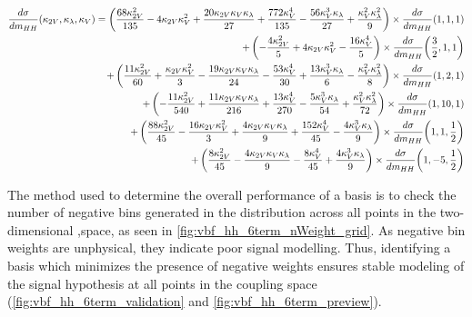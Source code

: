     \begin{equation}
    \label{eqn:vbf_hh_6term_chosen}
    \begin{split}
        \frac{d\sigma}{dm_{HH}}(\kappa_{2V}, \kappa_{\lambda}, \kappa_{V}) =
            \left(\frac{68 \kappa_{2V}^{2}}{135} - 4 \kappa_{2V} \kappa_{V}^{2} + \frac{20 \kappa_{2V} \kappa_{V} \kappa_{\lambda}}{27} + \frac{772 \kappa_{V}^{4}}{135} - \frac{56 \kappa_{V}^{3} \kappa_{\lambda}}{27} + \frac{\kappa_{V}^{2} \kappa_{\lambda}^{2}}{9}\right) \times \frac{d\sigma}{dm_{HH}}{\left(1,1,1 \right)} \\
            + \left(- \frac{4 \kappa_{2V}^{2}}{5} + 4 \kappa_{2V} \kappa_{V}^{2} - \frac{16 \kappa_{V}^{4}}{5}\right) \times \frac{d\sigma}{dm_{HH}}{\left(\frac{3}{2},1,1 \right)} \\
            + \left(\frac{11 \kappa_{2V}^{2}}{60} + \frac{\kappa_{2V} \kappa_{V}^{2}}{3} - \frac{19 \kappa_{2V} \kappa_{V} \kappa_{\lambda}}{24} - \frac{53 \kappa_{V}^{4}}{30} + \frac{13 \kappa_{V}^{3} \kappa_{\lambda}}{6} - \frac{\kappa_{V}^{2} \kappa_{\lambda}^{2}}{8}\right) \times \frac{d\sigma}{dm_{HH}}{\left(1,2,1 \right)} \\
            + \left(- \frac{11 \kappa_{2V}^{2}}{540} + \frac{11 \kappa_{2V} \kappa_{V} \kappa_{\lambda}}{216} + \frac{13 \kappa_{V}^{4}}{270} - \frac{5 \kappa_{V}^{3} \kappa_{\lambda}}{54} + \frac{\kappa_{V}^{2} \kappa_{\lambda}^{2}}{72}\right) \times \frac{d\sigma}{dm_{HH}}{\left(1,10,1 \right)}  \\
            + \left(\frac{88 \kappa_{2V}^{2}}{45} - \frac{16 \kappa_{2V} \kappa_{V}^{2}}{3} + \frac{4 \kappa_{2V} \kappa_{V} \kappa_{\lambda}}{9} + \frac{152 \kappa_{V}^{4}}{45} - \frac{4 \kappa_{V}^{3} \kappa_{\lambda}}{9}\right) \times \frac{d\sigma}{dm_{HH}}{\left(1,1,\frac{1}{2} \right)} \\
            + \left(\frac{8 \kappa_{2V}^{2}}{45} - \frac{4 \kappa_{2V} \kappa_{V} \kappa_{\lambda}}{9} - \frac{8 \kappa_{V}^{4}}{45} + \frac{4 \kappa_{V}^{3} \kappa_{\lambda}}{9}\right) \times \frac{d\sigma}{dm_{HH}}{\left(1,-5,\frac{1}{2} \right)}
    \end{split}
    \end{equation}

    The method used to determine the overall performance of a basis is to check the number of negative bins generated
        in the \mhh distribution across all points in the two-dimensional \kvv,\kl space, as seen in \ref{fig:vbf_hh_6term_nWeight_grid}.
    As negative bin weights are unphysical, they indicate poor signal modelling.
    Thus, identifying a basis which minimizes the presence of negative weights ensures stable modeling of the signal hypothesis at all points in the coupling space (\ref{fig:vbf_hh_6term_validation} and \ref{fig:vbf_hh_6term_preview}).

